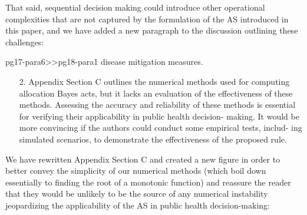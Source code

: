 \documentclass{article}
\begin{document}
That said, sequential decision making could introduce other operational complexities that are not captured by
the formulation of the AS introduced in this paper, and we have added a new paragraph to the discussion
outlining these challenges:
\begin{mybox}{pg17-para6>>pg18-para1}
\DIFaddend disease mitigation measures.  \DIFdelbegin {}\DIFdelend \DIFaddbegin {}
\end{mybox}

\begin{quotebar}
\begin{enumerate}
  \item[2.] Appendix Section C outlines the numerical methods used for computing allocation Bayes acts, but it lacks an evaluation of the effectiveness of these methods. Assessing the accuracy and reliability of these methods is essential for verifying their applicability in public health decision- making. It would be more convincing if the authors could conduct some empirical tests, includ- ing simulated scenarios, to demonstrate the effectiveness of the proposed rule.
\end{enumerate}
\end{quotebar}

We have rewritten Appendix Section C and created a new figure in order to better convey the simplicity of our numerical methods 
(which boil down essentially to finding the root of a monotonic function)
and reassure the reader that they would be unlikely to be the source of any numerical instability jeopardizing the applicability of the AS in
public health decision-making:
\end{document}
